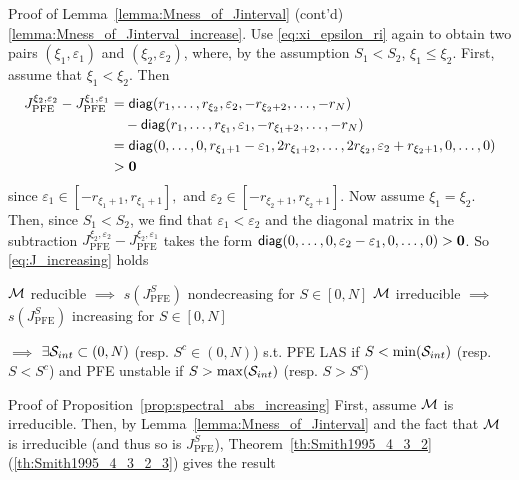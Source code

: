 \documentclass[aspectratio=169]{beamer}
\begin{document}
\begin{frame}{Proof of Lemma~\ref{lemma:Mness_of_Jinterval} (cont'd)}
	\ref{lemma:Mness_of_Jinterval_increase}. Use \eqref{eq:xi_epsilon_ri} again to obtain two pairs $(\xi_1,\varepsilon_1)$ and $(\xi_2,\varepsilon_2)$, where, by the assumption $S_1<S_2$, $\xi_1\leq\xi_2$. First, assume that $\xi_1<\xi_2$. Then
	\begin{align*}
	J_{\textrm{PFE}}^{\xi_2,\varepsilon_2}-J_{\textrm{PFE}}^{\xi_1,\varepsilon_1} 
	&= \diag(r_1,\ldots,r_{\xi_2},\varepsilon_2,-r_{\xi_2+2},\ldots,-r_N) \\
	&\quad -
	\diag(r_1,\ldots,r_{\xi_1},\varepsilon_1,-r_{\xi_1+2},\ldots,-r_N) \\
	&= \diag(0,\ldots,0,r_{\xi_1+1}-\varepsilon_1,
	2r_{\xi_1+2},
	\ldots,
	2r_{\xi_2},\varepsilon_2+r_{\xi_2+1},0,\ldots,0) \\
	&>\b0
	\end{align*}
	since $\varepsilon_1 \in[-r_{\xi_1+1},r_{\xi_1+1}],$ and $\varepsilon_2\in[-r_{\xi_2+1},r_{\xi_2+1}]$. Now assume $\xi_1=\xi_2$. Then, since $S_1<S_2$, we find that $\varepsilon_1<\varepsilon_2$ and the diagonal matrix in the subtraction $J_{\textrm{PFE}}^{\xi_2,\varepsilon_2}-J_{\textrm{PFE}}^{\xi_2,\varepsilon_1}$ takes the form $\diag(0,\ldots,0,\varepsilon_2-\varepsilon_1,0,\ldots,0)>\b0$. So \eqref{eq:J_increasing} holds
\end{frame}


\begin{frame}
	\begin{proposition}\label{prop:spectral_abs_increasing}
		$\M$ reducible $\implies$ $s(J_{\textrm{PFE}}^S)$ nondecreasing for $S\in[0,N]$
		\vskip0.2cm
		$\M$ irreducible $\implies$ $s(J_{\textrm{PFE}}^S)$ increasing for $S\in[0,N]$
	\end{proposition}
	\vfill
	$\implies$ $\exists \S_{int}\subset(0,N)$ (resp. $S^c\in(0,N)$) s.t. PFE LAS if $S<\min(\S_{int})$ (resp. $S<S^c$) and PFE unstable if $S>\max(\S_{int})$ (resp. $S>S^c$)
\end{frame}

\begin{frame}{Proof of Proposition~\ref{prop:spectral_abs_increasing}}
	First, assume $\M$ is irreducible. Then, by Lemma~\ref{lemma:Mness_of_Jinterval} and the fact that $\M$ is irreducible (and thus so is $J_{\textrm{PFE}}^S$), Theorem~\ref{th:Smith1995_4_3_2}(\ref{th:Smith1995_4_3_2_3}) gives the result
\end{frame}
\end{document}
